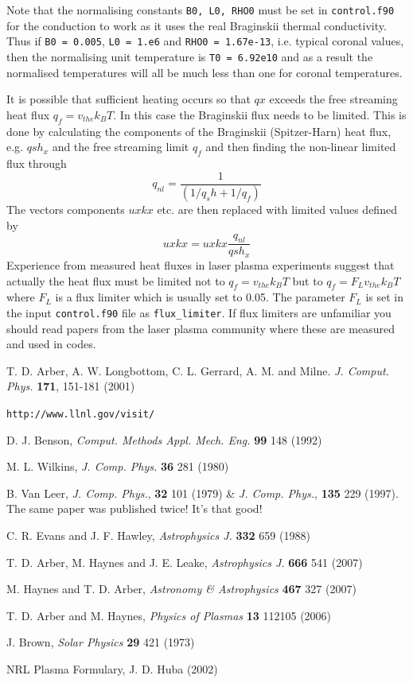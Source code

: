 \documentclass[11pt]{article}
\begin{document}
Note that the normalising constants \texttt{B0, L0, RHO0} must be set in \texttt{control.f90} for the conduction to work as it uses the real Braginskii thermal conductivity. Thus if \texttt{B0 = 0.005}, \texttt{L0 = 1.e6} and \texttt{RHO0 = 1.67e-13}, i.e. typical coronal values, then the normalising unit temperature is \texttt{T0 = 6.92e10} and as a result the normalised temperatures will all be much less than one for coronal temperatures.  

It is possible that sufficient heating occurs so that $qx$ exceeds the free streaming heat flux $q_f=v_{the} k_B T$. In this case the Braginskii flux needs to be limited. This is done by calculating the components of the Braginskii (Spitzer-Harn) heat flux, e.g. $qsh_x$ and the free streaming limit $q_f$ and then finding the non-linear limited flux through
\[
q_{nl} = \frac{1}{(1/q_sh + 1/q_f)}
\] 
The vectors components $uxkx$ etc. are then replaced with limited values defined by 
\[
uxkx=uxkx\frac{q_{nl}}{qsh_x}
\]
Experience from measured heat fluxes in laser plasma experiments suggest that actually the heat flux must be limited not to $q_f=v_{the} k_B T$ but to $q_f=F_L v_{the} k_B T$  where $F_L$ is a flux limiter which is usually set to 0.05. The parameter $F_L$ is set in the input \texttt{control.f90} file as \texttt{flux\_limiter}. If flux limiters are unfamiliar you should read papers from the laser plasma community where these are measured and used in codes.

\newpage
\begin{thebibliography}{}

 T. D. Arber, A. W. Longbottom, C. L. Gerrard, A. M. and Milne. \textit{J. Comput. Phys.} \textbf{171}, 151-181 (2001)

 \texttt{http://www.llnl.gov/visit/}

 D. J. Benson, \textit{Comput. Methods Appl. Mech. Eng.} \textbf{99} 148 (1992) 

 M. L. Wilkins, \textit{J. Comp. Phys.} \textbf{36} 281 (1980)

 B. Van Leer, \textit{J. Comp. Phys.}, \textbf{32} 101 (1979)  \& \textit{J. Comp. Phys.}, \textbf{135} 229 (1997). The same paper was published twice! It's that good!

 C. R. Evans and J. F. Hawley, \textit{Astrophysics J.} \textbf{332} 659 (1988) 

 T. D. Arber, M. Haynes and J. E. Leake, {\it Astrophysics J.} \textbf{666} 541 (2007)

 M. Haynes and T. D. Arber, \textit{Astronomy \& Astrophysics } \textbf{467} 327 (2007)

 T. D. Arber and M. Haynes, \textit{Physics of Plasmas} \textbf{13} 112105 (2006)

 J. Brown, \textit{Solar Physics} \textbf{29} 421 (1973)

 NRL Plasma Formulary, J. D. Huba (2002)

\end{thebibliography}
\end{document}
